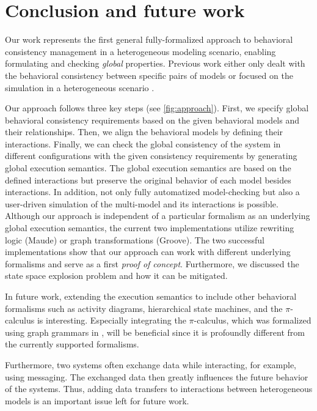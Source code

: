 \documentclass{jot}
\begin{document}
\section{Conclusion and future work} \label{sec:conclusion_and_future_work}
Our work represents the first general fully-formalized approach to behavioral consistency management in a heterogeneous modeling scenario, enabling formulating and checking \emph{global} properties.
Previous work either only dealt with the behavioral consistency between specific pairs of models \cite{yaoConsistencyCheckingUML2006, kusterExplicitBehavioralConsistency2003} or focused on the simulation in a heterogeneous scenario \cite{deantoniModelingBehavioralSemantics2016, varalarsenBCoolBehavioralCoordination2016, ekerTamingHeterogeneityPtolemy2003, leeDisciplinedHeterogeneousModeling2010}.

Our approach follows three key steps (see \cref{fig:approach}).
First, we specify global behavioral consistency requirements based on the given behavioral models and their relationships. 
Then, we align the behavioral models by defining their interactions.
Finally, we can check the global consistency of the system in different configurations with the given consistency requirements by generating global execution semantics.
The global execution semantics are based on the defined interactions but preserve the original behavior of each model besides interactions.
In addition, not only fully automatized model-checking but also a user-driven simulation of the multi-model and its interactions is possible.
Although our approach is independent of a particular formalism as an underlying global execution semantics, the current two implementations utilize rewriting logic (Maude) or graph transformations (Groove).
The two successful implementations show that our approach can work with different underlying formalisms and serve as a first \textit{proof of concept}.
Furthermore, we discussed the state space explosion problem and how it can be mitigated.

In future work, extending the execution semantics to include other behavioral formalisms such as activity diagrams, hierarchical state machines, and the $\pi$-calculus is interesting.
Especially integrating the $\pi$-calculus, which was formalized using graph grammars in \cite{gadducciGraphRewritingPcalculus2007}, will be beneficial since it is profoundly different from the currently supported formalisms.

Furthermore, two systems often exchange data while interacting, for example, using messaging.
The exchanged data then greatly influences the future behavior of the systems.
Thus, adding data transfers to interactions between heterogeneous models is an important issue left for future work.
\end{document}
